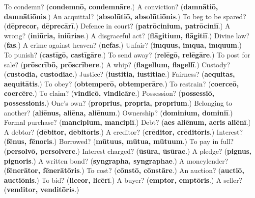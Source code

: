 \begin{tcolorbox}[breakable,colback=teal!4,colframe=teal!35!black,title={Before you move on}]
To condemn? (\textbf{condemnō, condemnāre}.) A conviction? (\textbf{damnātiō, damnātiōnis}.) An acquittal? (\textbf{absolūtiō, absolūtiōnis}.) To beg to be spared? (\textbf{dēprecor, dēprecārī}.) Defence in court? (\textbf{patrōcinium, patrōciniī}.) A wrong? (\textbf{iniūria, iniūriae}.) A disgraceful act? (\textbf{flāgitium, flāgitiī}.) Divine law? (\textbf{fās}.) A crime against heaven? (\textbf{nefās}.) Unfair? (\textbf{inīquus, inīqua, inīquum}.) To punish? (\textbf{castīgō, castīgāre}.) To send away? (\textbf{relēgō, relēgāre}.) To post for sale? (\textbf{prōscrībō, prōscrībere}.) A whip? (\textbf{flagellum, flagellī}.) Custody? (\textbf{custōdia, custōdiae}.) Justice? (\textbf{iūstitia, iūstitiae}.) Fairness? (\textbf{aequitās, aequitātis}.) To obey? (\textbf{obtemperō, obtemperāre}.) To restrain? (\textbf{coerceō, coercēre}.) To claim? (\textbf{vindicō, vindicāre}.) Possession? (\textbf{possessiō, possessiōnis}.) One's own? (\textbf{proprius, propria, proprium}.) Belonging to another? (\textbf{aliēnus, aliēna, aliēnum}.) Ownership? (\textbf{dominium, dominiī}.) Formal purchase? (\textbf{mancipium, mancipiī}.) Debt? (\textbf{aes aliēnum, aeris aliēnī}.) A debtor? (\textbf{dēbitor, dēbitōris}.) A creditor? (\textbf{crēditor, crēditōris}.) Interest? (\textbf{fēnus, fēnoris}.) Borrowed? (\textbf{mūtuus, mūtua, mūtuum}.) To pay in full? (\textbf{persolvō, persolvere}.) Interest charged? (\textbf{ūsūra, ūsūrae}.) A pledge? (\textbf{pignus, pignoris}.) A written bond? (\textbf{syngrapha, syngraphae}.) A moneylender? (\textbf{fēnerātor, fēnerātōris}.) To cost? (\textbf{cōnstō, cōnstāre}.) An auction? (\textbf{auctiō, auctiōnis}.) To bid? (\textbf{liceor, licērī}.) A buyer? (\textbf{emptor, emptōris}.) A seller? (\textbf{venditor, venditōris}.)
\end{tcolorbox}
